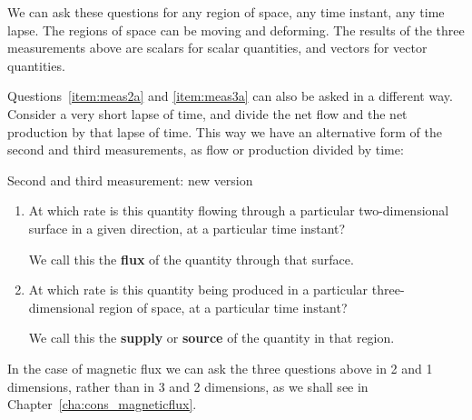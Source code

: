 \documentclass[a4paper,12pt,%
onecolumn,oneside,%
british%
]{memoir}
\renewcommand*{\|}[1][]{\nonscript\:#1\vert\nonscript\:\mathopen{}}
\newcommand*{\chap}{Chapter}%
\begin{document}
We can ask these questions for any region of space, any time instant, any time lapse. The regions of space can be moving and deforming. The results of the three measurements above are scalars for scalar quantities, and vectors for vector quantities.

Questions~\ref{item:meas2a} and \ref{item:meas3a} can also be asked in a different way. Consider a very short lapse of time, and divide the net flow and the net production by that lapse of time. This way we have an alternative form of the second and third measurements, as flow or production divided by time:
\begin{definition}{Second and third measurement: new version}\label{def:fluxsupply}
  \begin{enumerate}[label={M\arabic*b}.,start=2,leftmargin=3em]

  \item At which rate is this quantity flowing through a particular two-dimensional surface in a given direction, at a particular time instant?

    We call this the \textbf{flux} of the quantity through that surface.

  \item At which rate is this quantity being produced in a particular three-dimensional region of space, at a particular time instant?

    We call this the \textbf{supply} or \textbf{source} of the quantity in that region.
  \end{enumerate}
\end{definition}

In the case of magnetic flux we can ask the three questions above in 2 and 1 dimensions, rather than in 3 and 2 dimensions, as we shall see in \chap~\ref{cha:cons_magneticflux}.

\end{document}
